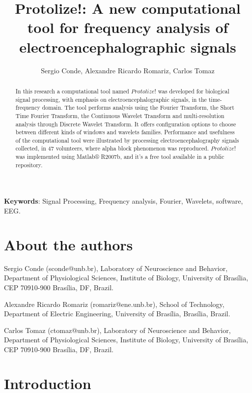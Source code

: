 \documentclass[12pt, a4paper]{article}
\begin{document}
\title{Protolize!: A new computational tool for frequency analysis of electroencephalographic signals}
\author{Sergio Conde, Alexandre Ricardo Romariz, Carlos Tomaz}
\maketitle

\begin{abstract}

In this research a computational tool named $Protolize!$ was developed for biological signal processing, with emphasis on electroencephalographic signals, in the time-frequency domain. The tool performs analysis using the Fourier Transform, the Short Time Fourier Transform, the Continuous Wavelet Transform and multi-resolution analysis through Discrete Wavelet Transform. It offers configuration options to choose between different kinds of windows and wavelets families. Performance and usefulness of the computational tool were illustrated by processing electroencephalography signals collected, in 47 volunteers, where alpha block phenomenon was reproduced. $Protolize!$ was implemented using Matlab® R2007b, and it’s a free tool available in a public repository. 

\end{abstract}

\textbf{Keywords}: Signal Processing, Frequency analysis, Fourier, Wavelets, software, EEG.

\section{About the authors}

Sergio Conde (sconde@unb.br), Laboratory of Neuroscience and Behavior, Department of Physiological Sciences, Institute of Biology, University of Brasília, CEP 70910-900 Brasília, DF,  Brazil.

Alexandre Ricardo Romariz (romariz@ene.unb.br), School of Technology, Department of Electric Engineering, University of Brasília, Brasília, Brazil.

Carlos Tomaz (ctomaz@unb.br), Laboratory of Neuroscience and Behavior, Department of Physiological Sciences, Institute of Biology, University of Brasília, CEP 70910-900 Brasília, DF,  Brazil.

\section{Introduction}
\end{document}
